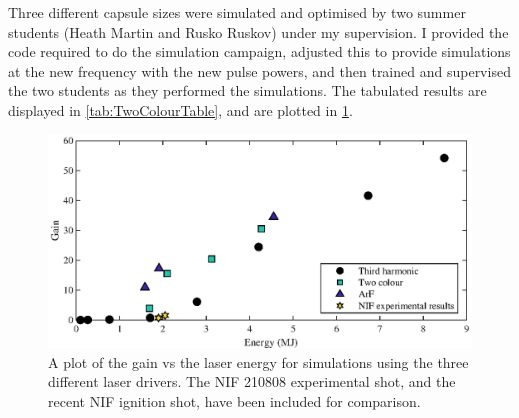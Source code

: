 Three different capsule sizes were simulated and optimised by two summer students (Heath Martin and Rusko Ruskov) under my supervision. I provided the code required to do the simulation campaign, adjusted this to provide simulations at the new frequency with the new pulse powers, and then trained and supervised the two students as they performed the simulations. The tabulated results are displayed in \ref{tab:TwoColourTable}, and are plotted in \ref{fig:ArF and Two colour}.

\begin{figure}[ht]
\centering
\includegraphics{figures/FurtherSims/ArFandTwoColour.eps}
\caption{A plot of the gain vs the laser energy for simulations using the three different laser drivers. The NIF 210808 experimental shot, and the recent NIF ignition shot, have been included for comparison.}
\label{fig:ArF and Two colour}
\end{figure}

